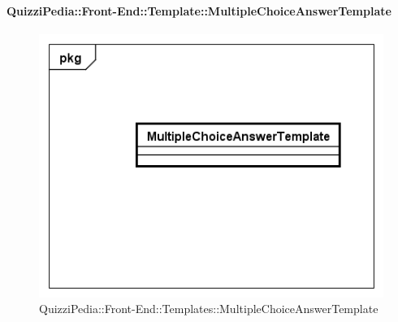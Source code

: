		\paragraph{QuizziPedia::Front-End::Template::MultipleChoiceAnswerTemplate}
		
		\label{QuizziPedia::Front-End::Templates::MultipleChoiceAnswerTemplate}
		
		\begin{figure}[ht]
			\centering
			\includegraphics[scale=0.5,keepaspectratio]{UML/Classi/Front-End/QuizziPedia_Front-end_Templates_MultipleChoiceAnswerTemplate.png}
			\caption{QuizziPedia::Front-End::Templates::MultipleChoiceAnswerTemplate}
		\end{figure} \FloatBarrier
		
